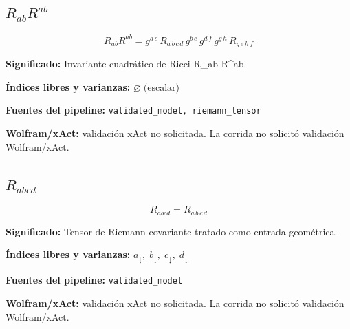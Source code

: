 \documentclass[11pt]{article}
\begin{document}
\subsection*{$ R_{ab}R^{ab} $}
\begin{dmath*}[breakdepth={5}]
R_{ab}R^{ab} = g{}^{a\,c}\,R{}_{a\,b\,c\,d}\,g{}^{b\,e}\,g{}^{d\,f}\,g{}^{g\,h}\,R{}_{g\,e\,h\,f}
\end{dmath*}
\par\vspace{1.2\baselineskip}\noindent
\begin{minipage}{\linewidth}
\textbf{Significado:} Invariante cuadrático de Ricci R\_ab R^ab.\par
\textbf{Índices libres y varianzas:} $ \varnothing\;\text{(escalar)} $\par
\textbf{Fuentes del pipeline:} \texttt{validated\_model, riemann\_tensor}\par
\textbf{Wolfram/xAct:} validación xAct no solicitada. La corrida no solicitó validación Wolfram/xAct.\par
\end{minipage}
\subsection*{$ R_{abcd} $}
\begin{dmath*}[breakdepth={5}]
R_{abcd} = R{}_{a\,b\,c\,d}
\end{dmath*}
\par\vspace{1.2\baselineskip}\noindent
\begin{minipage}{\linewidth}
\textbf{Significado:} Tensor de Riemann covariante tratado como entrada geométrica.\par
\textbf{Índices libres y varianzas:} $ a_{\downarrow},\;b_{\downarrow},\;c_{\downarrow},\;d_{\downarrow} $\par
\textbf{Fuentes del pipeline:} \texttt{validated\_model}\par
\textbf{Wolfram/xAct:} validación xAct no solicitada. La corrida no solicitó validación Wolfram/xAct.\par
\end{minipage}
\end{document}
